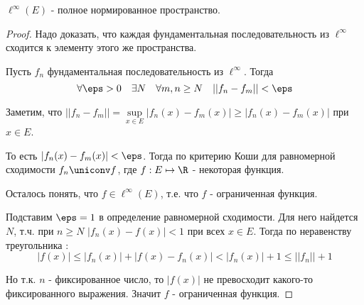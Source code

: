 \begin{theorem} \thmslashn
	
	$\ell^{\infty}(E)$ - полное нормированное пространство.
	
	\begin{proof} \thmslashn
		
		Надо доказать, что каждая фундаментальная последовательность из $\ell^{\infty}$ сходится к элементу этого же пространства.
		
		Пусть $f_n$ фундаментальная последовательность из $\ell^{\infty}$. Тогда
		\[\forall {\eps > 0} \quad {\exists N} \quad \forall {m,n \ge N} \quad || f_n - f_m|| < \eps \]
		
		Заметим, что $|| f_n - f_m || = \sup\limits_{x \in E}|f_n(x) - f_m(x) | \ge |f_n(x) - f_m(x)|$ при $x \in E$.
		
		То есть $|f_n(x) - f_m(x)| < \eps$. Тогда по критерию Коши для равномерной сходимости $f_n \uniconv f$, где $f : E \mapsto \R$ - некоторая функция.
		
		Осталось понять, что $f \in \ell^{\infty}(E)$, т.е. что $f$ - ограниченная функция.
		
		Подставим $\eps = 1$ в определение равномерной сходимости. Для него найдется $N$, т.ч. при $n \ge N$ $|f_n(x) - f(x)| < 1$ при всех $x \in E$. Тогда по неравенству треугольника : 
		\[|f(x)| \le |f_n(x)| + |f(x) - f_n(x)| < |f_n(x)| + 1 \le ||f_n|| + 1\]
		
		Но т.к. $n$ - фиксированное число, то $|f(x)|$ не превосходит какого-то фиксированного выражения. Значит $f$ - ограниченная функция.
 	\end{proof}
\end{theorem}